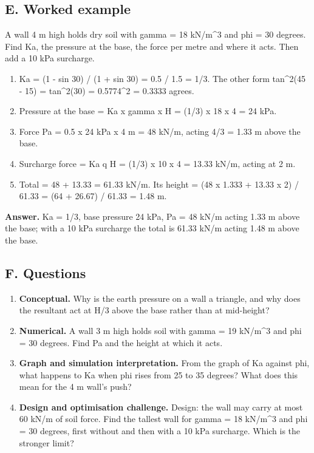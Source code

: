 \documentclass[11pt,a4paper]{article}
\begin{document}
\subsection*{E. Worked example}
A wall 4 m high holds dry soil with gamma = 18 kN/m\textasciicircum{}3 and phi = 30 degrees. Find Ka, the pressure at the base, the force per metre and where it acts. Then add a 10 kPa surcharge.
\begin{enumerate}[nosep]
\item Ka = (1 - sin 30) / (1 + sin 30) = 0.5 / 1.5 = 1/3. The other form tan\textasciicircum{}2(45 - 15) = tan\textasciicircum{}2(30) = 0.5774\textasciicircum{}2 = 0.3333 agrees.
\item Pressure at the base = Ka x gamma x H = (1/3) x 18 x 4 = 24 kPa.
\item Force Pa = 0.5 x 24 kPa x 4 m = 48 kN/m, acting 4/3 = 1.33 m above the base.
\item Surcharge force = Ka q H = (1/3) x 10 x 4 = 13.33 kN/m, acting at 2 m.
\item Total = 48 + 13.33 = 61.33 kN/m. Its height = (48 x 1.333 + 13.33 x 2) / 61.33 = (64 + 26.67) / 61.33 = 1.48 m.
\end{enumerate}
\textbf{Answer.} Ka = 1/3, base pressure 24 kPa, Pa = 48 kN/m acting 1.33 m above the base; with a 10 kPa surcharge the total is 61.33 kN/m acting 1.48 m above the base.

\subsection*{F. Questions}
\begin{enumerate}[nosep]
\item \textbf{Conceptual.} Why is the earth pressure on a wall a triangle, and why does the resultant act at H/3 above the base rather than at mid-height?
\item \textbf{Numerical.} A wall 3 m high holds soil with gamma = 19 kN/m\textasciicircum{}3 and phi = 30 degrees. Find Pa and the height at which it acts.
\item \textbf{Graph and simulation interpretation.} From the graph of Ka against phi, what happens to Ka when phi rises from 25 to 35 degrees? What does this mean for the 4 m wall's push?
\item \textbf{Design and optimisation challenge.} Design: the wall may carry at most 60 kN/m of soil force. Find the tallest wall for gamma = 18 kN/m\textasciicircum{}3 and phi = 30 degrees, first without and then with a 10 kPa surcharge. Which is the stronger limit?
\end{enumerate}
\end{document}
